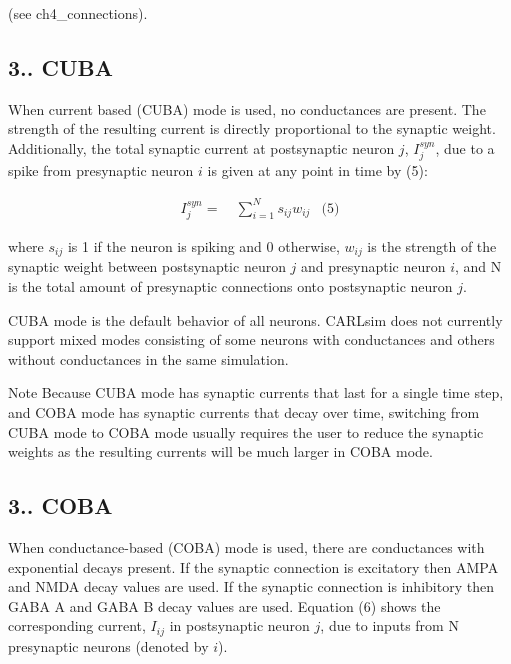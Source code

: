 (see ch4\+\_\+connections).\hypertarget{ch3_neurons_synapses_groups_ch3s2s1_cuba}{}\subsection{3.. C\+U\+BA}\label{ch3_neurons_synapses_groups_ch3s2s1_cuba}
When current based (C\+U\+BA) mode is used, no conductances are present. The strength of the resulting current is directly proportional to the synaptic weight. Additionally, the total synaptic current at postsynaptic neuron $j$, $ I_{j}^{syn} $, due to a spike from presynaptic neuron $i$ is given at any point in time by (5)\+:

\begin{align*} I_{j}^{syn} = & ~ \sum \limits_{i=1}^{N} s_{ij}w_{ij} & \text{(5)} \end{align*}

where $s_{ij}$ is 1 if the neuron is spiking and 0 otherwise, $w_{ij}$ is the strength of the synaptic weight between postsynaptic neuron $j$ and presynaptic neuron $i$, and N is the total amount of presynaptic connections onto postsynaptic neuron $j$.

C\+U\+BA mode is the default behavior of all neurons. C\+A\+R\+Lsim does not currently support mixed modes consisting of some neurons with conductances and others without conductances in the same simulation.

\begin{DoxyNote}{Note}
Because C\+U\+BA mode has synaptic currents that last for a single time step, and C\+O\+BA mode has synaptic currents that decay over time, switching from C\+U\+BA mode to C\+O\+BA mode usually requires the user to reduce the synaptic weights as the resulting currents will be much larger in C\+O\+BA mode.
\end{DoxyNote}
\hypertarget{ch3_neurons_synapses_groups_ch3s2s2_coba}{}\subsection{3.. C\+O\+BA}\label{ch3_neurons_synapses_groups_ch3s2s2_coba}
When conductance-\/based (C\+O\+BA) mode is used, there are conductances with exponential decays present. If the synaptic connection is excitatory then A\+M\+PA and N\+M\+DA decay values are used. If the synaptic connection is inhibitory then G\+A\+BA A and G\+A\+BA B decay values are used. Equation (6) shows the corresponding current, $I_{ij}$ in postsynaptic neuron $j$, due to inputs from N presynaptic neurons (denoted by $i$).

